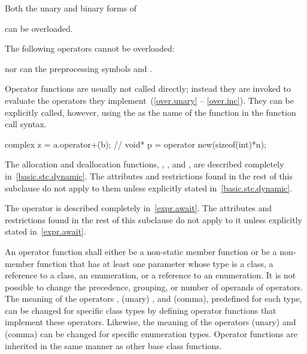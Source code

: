 \pnum
Both the unary and binary forms of
\begin{ncsimplebnf}\obeyspaces
\terminal{+      -      *      \&}
\end{ncsimplebnf}
can be overloaded.

\pnum
{}%
The following operators cannot be overloaded:
\begin{ncsimplebnf}\obeyspaces
{}
\end{ncsimplebnf}
nor can the preprocessing symbols
\tcode{\#}
and
\tcode{\#\#}.

\pnum
{}%
Operator functions are usually not called directly; instead they are invoked
to evaluate the operators they implement~(\ref{over.unary} -- \ref{over.inc}).
They can be explicitly called, however, using the
as the name of the function in the function call syntax.
\begin{example}
\begin{codeblock}
complex z = a.operator+(b);     // 
void* p = operator new(sizeof(int)*n);
\end{codeblock}
\end{example}

\pnum
The allocation and deallocation functions,
,
,
and
,
are described completely in~\ref{basic.stc.dynamic}.
The attributes and restrictions
found in the rest of this subclause do not apply to them unless explicitly
stated in~\ref{basic.stc.dynamic}.

\pnum
The  operator is described completely in~\ref{expr.await}.
The attributes and restrictions
found in the rest of this subclause do not apply to it unless explicitly
stated in~\ref{expr.await}.

\pnum
{}%
An operator function
shall either be a non-static member function or be a non-member function that
has at least one parameter whose type is a class, a reference to a class, an
enumeration, or a reference to an enumeration.
It is not possible to change the precedence, grouping, or number of operands
of operators.
The meaning of
the operators \tcode{=}, (unary) \tcode{\&}, and \tcode{,} (comma),
predefined for each type, can be changed for specific class types by
defining operator functions that implement these operators.
Likewise, the meaning of the operators (unary) \tcode{\&} and \tcode{,} (comma)
can be changed for specific enumeration types.
%
Operator functions are inherited in the same manner as other base class
functions.


